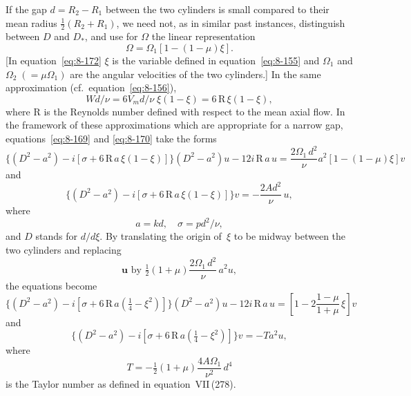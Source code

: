 If the gap $d = R_2 - R_1$ between the two cylinders is small compared to their mean radius $\frac{1}{2}(R_2+R_1)$, we need not, as in similar past instances, distinguish between $D$ and $D_*$, and use for $\Omega$ the linear representation
\begin{equation}
\label{eq:8-172}
\Omega = \Omega_1[1-(1-\mu)\xi].
\end{equation}
[In equation~\eqref{eq:8-172} $\xi$ is the variable defined in equation~\eqref{eq:8-155} and $\Omega_1$ and $\Omega_2\;(= \mu\Omega_1)$ are the angular velocities of the two cylinders.] In the same approximation (cf.\ equation~\eqref{eq:8-156}),
\begin{equation}
\label{eq:8-173}
Wd/\nu = 6V_m d/\nu\;\xi(1-\xi) = 6\,\mathrm{R}\,\xi(1-\xi),
\end{equation}
where R is the Reynolds number defined with respect to the mean axial flow. In the framework of these approximations which are appropriate for a narrow gap, equations~\eqref{eq:8-169} and \eqref{eq:8-170} take the forms
\begin{equation}
\label{eq:8-174}
\bigl\{(D^2-a^2) - i[\sigma + 6\,\mathrm{R}\,a\,\xi(1-\xi)]\bigr\}(D^2 - a^2)u - 12i\,\mathrm{R}\,a\,u = \frac{2\Omega_1\,d^2}{\nu}a^2[1-(1-\mu)\xi]v
\end{equation}
and
\begin{equation}
\label{eq:8-175}
\bigl\{(D^2-a^2) - i[\sigma + 6\,\mathrm{R}\,a\,\xi(1-\xi)]\bigr\}v = -\frac{2Ad^2}{\nu}\,u,
\end{equation}
where
\begin{equation}
\label{eq:8-176}
a = kd, \quad \sigma = pd^2/\nu,
\end{equation}
and $D$ stands for $d/d\xi$. By translating the origin of~$\xi$ to be midway between the two cylinders and replacing
\begin{equation}
\label{eq:8-177}
\mathbf{u} \text{ by } \tfrac{1}{2}(1+\mu)\frac{2\Omega_1\,d^2}{\nu}\,a^2 u,
\end{equation}
the equations become
\begin{equation}
\label{eq:8-178}
\bigl\{(D^2 - a^2) - i[\sigma + 6\,\mathrm{R}\,a(\tfrac{1}{4}-\xi^2)]\bigr\}(D^2 - a^2)u - 12i\,\mathrm{R}\,a\,u = \left[1 - 2\frac{1-\mu}{1+\mu}\,\xi\right]v
\end{equation}
and
\begin{equation}
\label{eq:8-179}
\bigl\{(D^2 - a^2) - i[\sigma + 6\,\mathrm{R}\,a(\tfrac{1}{4}-\xi^2)]\bigr\}v = -Ta^2 u,
\end{equation}
where
\begin{equation}
\label{eq:8-180}
T = -\tfrac{1}{2}(1+\mu)\frac{4A\Omega_1}{\nu^2}\,d^4
\end{equation}
is the Taylor number as defined in equation~VII\,(278).

